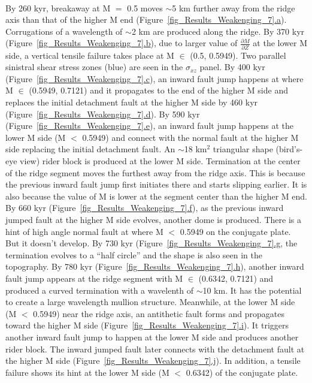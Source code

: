 ~\\
By 260 kyr, breakaway at M $=$ 0.5 moves $\sim$5 km further away from the ridge axis than that of the higher M end (Figure~\hyperref[fig_Results_Weakenging_7]{\ref{fig_Results_Weakenging_7}.a}). Corrugations of a wavelength of $\sim$2 km are produced along the ridge. By 370 kyr (Figure~\hyperref[fig_Results_Weakenging_7]{\ref{fig_Results_Weakenging_7}.b}), due to larger value of $\frac{\partial M}{\partial Z}$ at the lower M side, a vertical tensile failure takes place at M $\in$ (0.5, 0.5949). Two parallel sinistral shear stress zones (blue) are seen in the $\sigma_{xz}$ panel. By 400 kyr (Figure~\hyperref[fig_Results_Weakenging_7]{\ref{fig_Results_Weakenging_7}.c}), an inward fault jump happens at where M $\in$ (0.5949, 0.7121) and it propagates to the end of the higher M side and replaces the initial detachment fault at the higher M side by 460 kyr (Figure~\hyperref[fig_Results_Weakenging_7]{\ref{fig_Results_Weakenging_7}.d}). By 590 kyr (Figure~\hyperref[fig_Results_Weakenging_7]{\ref{fig_Results_Weakenging_7}.e}), an inward fault jump happens at the lower M side (M $<$ 0.5949) and connect with the normal fault at the higher M side replacing the initial detachment fault. An $\sim$18 km$^{2}$ triangular shape (bird's-eye view) rider block is produced at the lower M side. Termination at the center of the ridge segment moves the furthest away from the ridge axis. This is because the previous inward fault jump first initiates there and starts slipping earlier. It is also because the value of M is lower at the segment center than the higher M end. By 660 kyr (Figure~\hyperref[fig_Results_Weakenging_7]{\ref{fig_Results_Weakenging_7}.f}), as the previous inward jumped fault at the higher M side evolves, another dome is produced. There is a hint of high angle normal fault at where M $<$ 0.5949 on the conjugate plate. But it doesn't develop. By 730 kyr (Figure~\hyperref[fig_Results_Weakenging_7]{\ref{fig_Results_Weakenging_7}.g}, the termination evolves to a ``half circle'' and the shape is also seen in the topography. By 780 kyr (Figure~\hyperref[fig_Results_Weakenging_7]{\ref{fig_Results_Weakenging_7}.h}), another inward fault jump appears at the ridge segment with M $\in$ (0.6342, 0.7121) and produced a curved termination with a wavelenth of $\sim$10 km. It has the potential to create a large wavelength mullion structure. Meanwhile, at the lower M side (M $<$ 0.5949) near the ridge axis, an antithetic fault forms and propagates toward the higher M side (Figure~\hyperref[fig_Results_Weakenging_7]{\ref{fig_Results_Weakenging_7}.i}). It triggers another inward fault jump to happen at the lower M side and produces another rider block. The inward jumped fault later connects with the detachment fault at the higher M side (Figure~\hyperref[fig_Results_Weakenging_7]{\ref{fig_Results_Weakenging_7}.j}). In addition, a tensile failure shows its hint at the lower M side (M $<$ 0.6342) of the conjugate plate.

